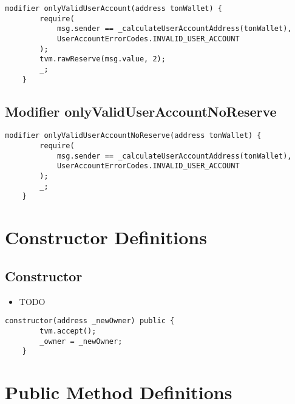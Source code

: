 \begin{lstlisting}[firstnumber=615]
    modifier onlyValidUserAccount(address tonWallet) {
        require(
            msg.sender == _calculateUserAccountAddress(tonWallet),
            UserAccountErrorCodes.INVALID_USER_ACCOUNT
        );
        tvm.rawReserve(msg.value, 2);
        _;
    }
\end{lstlisting}

\subsection{Modifier onlyValidUserAccountNoReserve}


\begin{lstlisting}[firstnumber=624]
    modifier onlyValidUserAccountNoReserve(address tonWallet) {
        require(
            msg.sender == _calculateUserAccountAddress(tonWallet),
            UserAccountErrorCodes.INVALID_USER_ACCOUNT
        );
        _;
    }
\end{lstlisting}

\section{Constructor Definitions}


\subsection{Constructor}

\noindent\begin{itemize}
\item TODO
\end{itemize}

\begin{lstlisting}[firstnumber=38]
    constructor(address _newOwner) public {
        tvm.accept();
        _owner = _newOwner;
    }
\end{lstlisting}

\section{Public Method Definitions}


